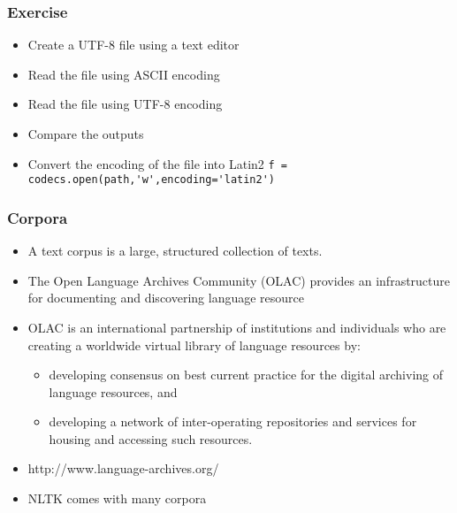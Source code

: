 \begin{frame}[fragile]\frametitle{Exercise}
\begin{itemize}
\item Create a UTF-8 file using a text editor
\item Read the file using ASCII encoding
\item Read the file using UTF-8 encoding
\item Compare the outputs
\item Convert the encoding of the file into Latin2
\lstinline|f = codecs.open(path,'w',encoding='latin2')|
\end{itemize}
\end{frame}

\begin{frame}[fragile]\frametitle{Corpora}
\begin{itemize}
\item A text corpus is a large, structured collection of texts. 
\item The Open Language Archives Community (OLAC) provides an infrastructure for documenting and discovering language resource
\item OLAC is an international partnership of institutions and individuals who are creating a worldwide virtual library of language resources by: 
\begin{itemize}
\item developing consensus on best current practice for the digital archiving of language resources, and 
\item developing a network of inter-operating repositories and services for housing and accessing such resources.
\end{itemize}
\item http://www.language-archives.org/
\item NLTK comes with many corpora

\end{itemize}
\end{frame}

